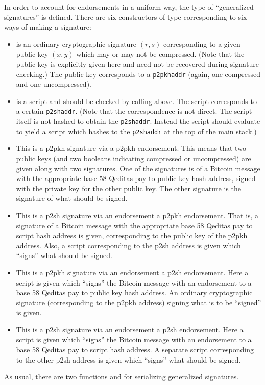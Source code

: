In order to account for endorsements in a uniform way,
the type {} of ``generalized signatures'' is defined.
There are six constructors of type {} corresponding to 
six ways of making a signature:
\begin{itemize}
\item {} is an ordinary cryptographic signature $(r,s)$ corresponding
to a given public key $(x,y)$ which may or may not be compressed. (Note that the public key is explicitly given here and need not be recovered during signature checking.)
The public key corresponds to a {\tt{p2pkhaddr}} (again, one compressed and one uncompressed).
\item {} is a script and should be checked by calling {} above.
The script corresponds to a certain {\tt{p2shaddr}}. (Note that the correspondence is not
direct. The script itself is not hashed to obtain the {\tt{p2shaddr}}.
Instead the script should evaluate to yield a script which hashes
to the {\tt{p2shaddr}} at the top of the main stack.)
\item {} This is a p2pkh signature via a p2pkh endorsement.
This means that two public keys (and two booleans indicating compressed or uncompressed) are given
along with two signatures.
One of the signatures is of a Bitcoin message with the appropriate base 58 Qeditas pay to public key hash address, signed with the private key for the other public key.
The other signature is the signature of what should be signed.
\item {}
This is a p2sh signature via an endorsement a p2pkh endorsement.
That is, a signature of a Bitcoin message with the appropriate base 58 Qeditas pay to script hash
address is given, corresponding to the public key of the p2pkh address.
Also, a script corresponding to the p2sh address is given which ``signs'' what should be signed.
\item {}
This is a p2pkh signature via an endorsement a p2sh endorsement.
Here a script is given which ``signs'' the Bitcoin message with an endorsement to a base 58 Qeditas pay to public key hash address.
An ordinary cryptographic signature (corresponding to the p2pkh address)
signing what is to be ``signed'' is given.
\item {}
This is a p2sh signature via an endorsement a p2sh endorsement.
Here a script is given which ``signs'' the Bitcoin message with an endorsement to a base 58 Qeditas pay to script hash address.
A separate script corresponding to the other p2sh address is given which ``signs'' what should be signed.
\end{itemize}
As usual, there are two functions {} and
{} for serializing generalized signatures.

